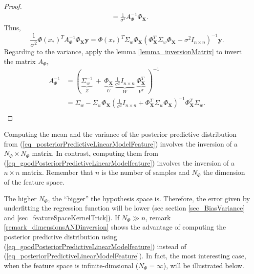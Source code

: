 \begin{proposition}
\begin{proof}
\begin{equation*}
\begin{aligned}
            &= \frac{1}{\sigma^2} A_{\Phi}^{-1} \Phi_{\pmb{X}}.
        \end{aligned} 
      \end{equation*}
    Thus,
      \begin{equation*}
        \frac{1}{\sigma^2}\Phi(x_*)^TA_{\Phi}^{-1}\Phi_{\pmb{X}}\pmb{y}
        = \Phi(x_*)^T \Sigma_w \Phi_{\pmb{X}} 
               \left( \Phi_{\pmb{X}}^T \Sigma_w \Phi_{\pmb{X}} + \sigma^2 I_{n \times n} \right)^{-1} \pmb{y}.
      \end{equation*}
    Regarding to the variance, apply the lemma \ref{lemma_inversionMatrix} to invert the matrix $A_{\Phi}$,
      \begin{equation*}
       \begin{aligned}
        A_{\Phi}^{-1} &= \left( \underbrace{\Sigma_w^{-1}}_{Z} \ + \
                   \underbrace{\Phi_{\pmb{X}}}_{U} \
                   \underbrace{\frac{1}{\sigma^2} I_{n \times n}}_{W} \
                   \underbrace{\Phi_{\pmb{X}}^T}_{V^T} \
                   \right)^{-1} \\ 
         &= \Sigma_w - \Sigma_w \Phi_{\pmb{X}} 
            \left( \frac{1}{\sigma^2} I_{n \times n} 
            + \Phi_{\pmb{X}}^T \Sigma_w \Phi_{\pmb{X}}
            \right)^{-1} \Phi_{\pmb{X}}^T \Sigma_w. \\
       \end{aligned}
      \end{equation*}
    \end{proof}
\end{proposition}

\begin{remark} \label{remark_dimensionsANDinversion}
  Computing the mean and the variance of the posterior predictive distribution from (\ref{eq_posteriorPredictiveLinearModelFeature}) involves the inversion of a $N_{\Phi} \times N_{\Phi}$ matrix. In contrast, computing them from (\ref{eq_goodPosteriorPredictiveLinearModelfeature}) involves the inversion of a $n \times n$ matrix. Remember that $n$ is the number of samples and $N_{\Phi}$ the dimension of the feature space.
\end{remark}

The higher $N_{\Phi}$, the ``bigger'' the hypothesis space is. Therefore, the error given by underfitting the regression function will be lower (see section \ref{sec_BiasVariance} and \ref{sec_featureSpaceKernelTrick}). If $N_{\Phi} \gg n$, remark \ref{remark_dimensionsANDinversion} shows the advantage of computing the posterior predictive distribution using (\ref{eq_goodPosteriorPredictiveLinearModelfeature}) instead of (\ref{eq_posteriorPredictiveLinearModelFeature}). In fact, the most interesting case, when the feature space is infinite\hyp{}dimsional ($N_{\Phi} = \infty$), will be illustrated below.

